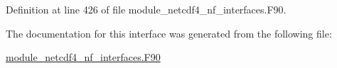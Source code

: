 Definition at line 426 of file module\+\_\+netcdf4\+\_\+nf\+\_\+interfaces.\+F90.



The documentation for this interface was generated from the following file\+:\begin{DoxyCompactItemize}
\item 
\hyperlink{module__netcdf4__nf__interfaces_8F90}{module\+\_\+netcdf4\+\_\+nf\+\_\+interfaces.\+F90}\end{DoxyCompactItemize}
